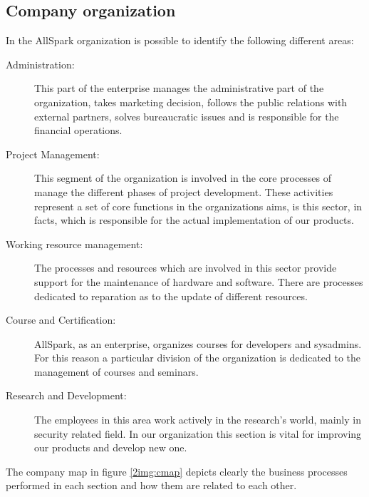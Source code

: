 \subsection{Company organization}
In the AllSpark organization is possible to identify the following
different areas:
\begin{description}
\item[Administration:] This part of the enterprise manages the
administrative part of the organization, takes marketing decision, follows
the public relations with external partners, solves bureaucratic issues
and is responsible for the financial operations.
\item[Project Management:] This segment of the organization is involved in
the core processes of manage the different phases of project development.
These activities represent a set of core functions in the organizations
aims, is this sector, in facts, which is responsible for the actual
implementation of our products.
\item[Working resource management:] The processes and resources which are
involved in this sector provide support for the maintenance of hardware
and software. There are processes dedicated to reparation as to the update
of different resources.
\item[Course and Certification:] AllSpark, as an enterprise, organizes
courses for developers and sysadmins. For this reason a particular division
of the organization is dedicated to the management of courses and seminars.
\item[Research and Development:] The employees in this area work actively in
the research's world, mainly in security related field. In our organization
this section is vital for improving our products and develop new one.
\end{description}

The company map in figure \ref{2img:cmap} depicts clearly the business processes
performed in each section and how them are related to each other.

